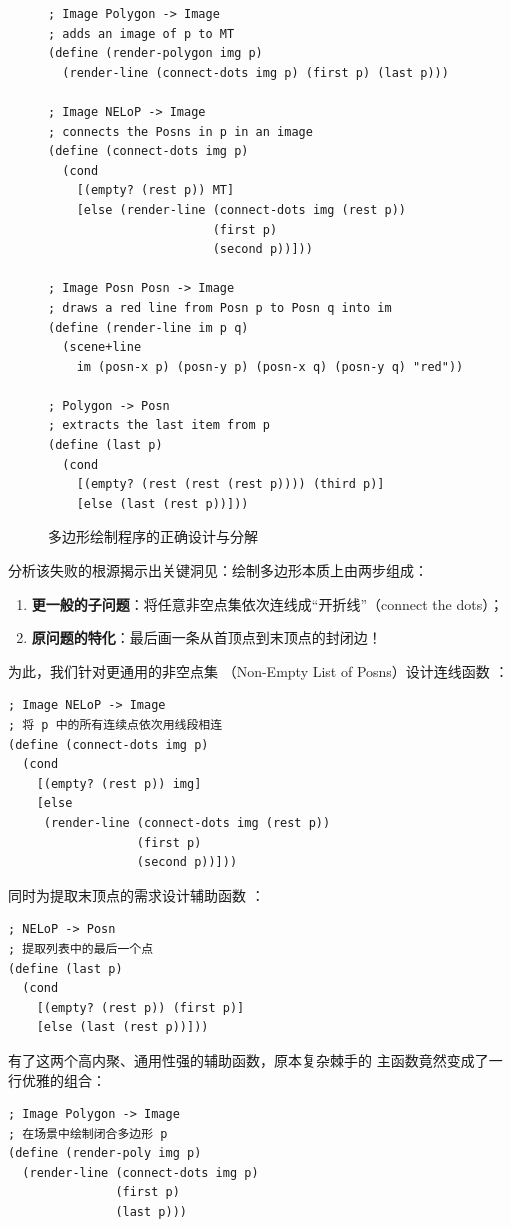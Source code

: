 \begin{figure}[htbp]
  \centering
\begin{lstlisting}[language=BSL, basicstyle=\scriptsize\ttfamily]
; Image Polygon -> Image
; adds an image of p to MT
(define (render-polygon img p)
  (render-line (connect-dots img p) (first p) (last p)))

; Image NELoP -> Image
; connects the Posns in p in an image
(define (connect-dots img p)
  (cond
    [(empty? (rest p)) MT]
    [else (render-line (connect-dots img (rest p))
                       (first p)
                       (second p))]))

; Image Posn Posn -> Image
; draws a red line from Posn p to Posn q into im
(define (render-line im p q)
  (scene+line
    im (posn-x p) (posn-y p) (posn-x q) (posn-y q) "red"))

; Polygon -> Posn
; extracts the last item from p
(define (last p)
  (cond
    [(empty? (rest (rest (rest p)))) (third p)]
    [else (last (rest p))]))
\end{lstlisting}
  \caption{多边形绘制程序的正确设计与分解}
  \label{fig:drawing_polygon}
\end{figure}

分析该失败的根源揭示出关键洞见：绘制多边形本质上由两步组成：
\begin{enumerate}
  \item \textbf{更一般的子问题}：将任意非空点集依次连线成“开折线”（connect the dots）；
  \item \textbf{原问题的特化}：最后画一条从首顶点到末顶点的封闭边！
\end{enumerate}

为此，我们针对更通用的非空点集 （Non-Empty List of Posns）设计连线函数 ：
\begin{lstlisting}[language=BSL]
; Image NELoP -> Image
; 将 p 中的所有连续点依次用线段相连
(define (connect-dots img p)
  (cond
    [(empty? (rest p)) img]
    [else
     (render-line (connect-dots img (rest p))
                  (first p)
                  (second p))]))
\end{lstlisting}

同时为提取末顶点的需求设计辅助函数 ：
\begin{lstlisting}[language=BSL]
; NELoP -> Posn
; 提取列表中的最后一个点
(define (last p)
  (cond
    [(empty? (rest p)) (first p)]
    [else (last (rest p))]))
\end{lstlisting}

有了这两个高内聚、通用性强的辅助函数，原本复杂棘手的  主函数竟然变成了一行优雅的组合：
\begin{lstlisting}[language=BSL]
; Image Polygon -> Image
; 在场景中绘制闭合多边形 p
(define (render-poly img p)
  (render-line (connect-dots img p)
               (first p)
               (last p)))
\end{lstlisting}

